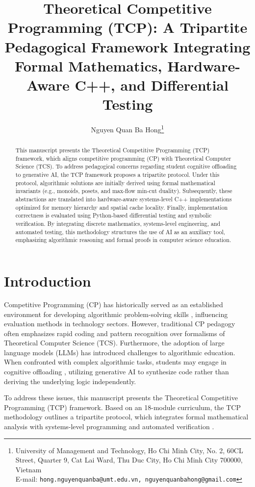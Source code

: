\documentclass[10pt, letterpaper]{article}
\title{Theoretical Competitive Programming (TCP): A Tripartite Pedagogical Framework Integrating Formal Mathematics, Hardware-Aware C++, and Differential Testing}
\author{Nguyen Quan Ba Hong\footnote{University of Management and Technology, Ho Chi Minh City, No. 2, 60CL Street, Quarter 9, Cat Lai Ward, Thu Duc City, Ho Chi Minh City 700000, Vietnam\\E-mail: {\tt hong.nguyenquanba@umt.edu.vn, nguyenquanbahong@gmail.com}}}
\begin{document}
\maketitle

\begin{abstract}
This manuscript presents the Theoretical Competitive Programming (TCP) framework, which aligns competitive programming (CP) with Theoretical Computer Science (TCS). To address pedagogical concerns regarding student cognitive offloading to generative AI, the TCP framework proposes a tripartite protocol. Under this protocol, algorithmic solutions are initially derived using formal mathematical invariants (e.g., monoids, posets, and max-flow min-cut duality). Subsequently, these abstractions are translated into hardware-aware systems-level C++ implementations optimized for memory hierarchy and spatial cache locality. Finally, implementation correctness is evaluated using Python-based differential testing and symbolic verification. By integrating discrete mathematics, systems-level engineering, and automated testing, this methodology structures the use of AI as an auxiliary tool, emphasizing algorithmic reasoning and formal proofs in computer science education.
\end{abstract}

\tableofcontents
\newpage

\section{Introduction}\label{sec:intro}
Competitive Programming (CP) has historically served as an established environment for developing algorithmic problem-solving skills \cite{wing2006computational}, influencing evaluation methods in technology sectors. However, traditional CP pedagogy often emphasizes rapid coding and pattern recognition over formalisms of Theoretical Computer Science (TCS). Furthermore, the adoption of large language models (LLMs) has introduced challenges to algorithmic education. When confronted with complex algorithmic tasks, students may engage in cognitive offloading \cite{rozenblit2002illusion}, utilizing generative AI to synthesize code rather than deriving the underlying logic independently.

To address these issues, this manuscript presents the Theoretical Competitive Programming (TCP) framework. Based on an 18-module curriculum, the TCP methodology outlines a tripartite protocol, which integrates formal mathematical analysis with systems-level programming and automated verification \cite{tao2026mathai,tao2006solving}. 
\end{document}
